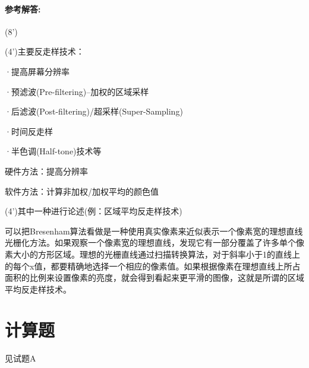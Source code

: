 \documentclass[12pt,a4paper,UTF8]{ctexart}
\begin{document}
	\paragraph{参考解答:}(8')
	\par (4')主要反走样技术：
	\par ·提高屏幕分辨率
	\par ·预滤波(Pre-filtering)--加权的区域采样
	\par ·后滤波(Post-filtering)/超采样(Super-Sampling)
	\par ·时间反走样
	\par ·半色调(Half-tone)技术等
	\par 硬件方法：提高分辨率
	\par 软件方法：计算非加权/加权平均的颜色值
	\par (4')其中一种进行论述(例：区域平均反走样技术)
	\par 可以把Bresenham算法看做是一种使用真实像素来近似表示一个像素宽的理想直线光栅化方法。如果观察一个像素宽的理想直线，发现它有一部分覆盖了许多单个像素大小的方形区域。理想的光栅直线通过扫描转换算法，对于斜率小于1的直线上的每个x值，都要精确地选择一个相应的像素值。如果根据像素在理想直线上所占面积的比例来设置像素的亮度，就会得到看起来更平滑的图像，这就是所谓的区域平均反走样技术。
	
	\section{计算题}
	\par 见试题A
	
		
	
	
\end{document}
